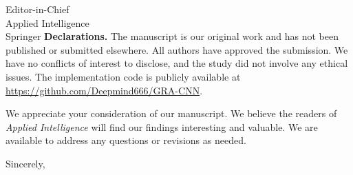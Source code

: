 \documentclass[11pt]{letter}
\begin{document}
\begin{letter}{Editor-in-Chief\\Applied Intelligence\\Springer}
\textbf{Declarations.}
The manuscript is our original work and has not been published or submitted elsewhere. All authors have approved the submission. We have no conflicts of interest to disclose, and the study did not involve any ethical issues. The implementation code is publicly available at \url{https://github.com/Deepmind666/GRA-CNN}.

We appreciate your consideration of our manuscript. We believe the readers of \emph{Applied Intelligence} will find our findings interesting and valuable. We are available to address any questions or revisions as needed.

\closing{Sincerely,}

\end{letter}
\end{document}
